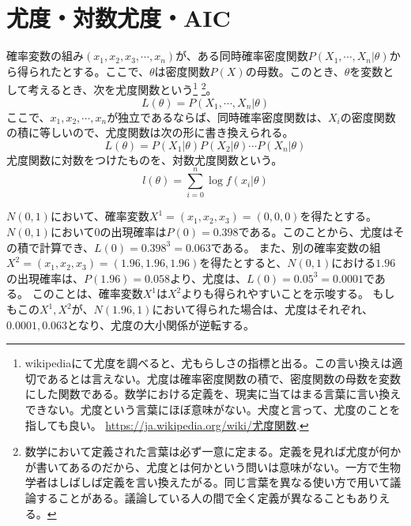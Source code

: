 \section{尤度・対数尤度・AIC}
\begin{defi}
    確率変数の組み$(x_1,x_2,x_3,\cdots,x_n)$が、ある同時確率密度関数$P(X_1,\cdots,X_n|\theta)$から得られたとする。ここで、$\theta$は密度関数$P(X)$の母数。このとき、$\theta$を変数として考えるとき、次を尤度関数という\footnote{wikipediaにて尤度を調べると、尤もらしさの指標と出る。この言い換えは適切であるとは言えない。尤度は確率密度関数の積で、密度関数の母数を変数にした関数である。数学における定義を、現実に当てはまる言葉に言い換えできない。尤度という言葉にほぼ意味がない。犬度と言って、尤度のことを指しても良い。
    \url{https://ja.wikipedia.org/wiki/尤度関数}.}
    \footnote{数学において定義された言葉は必ず一意に定まる。定義を見れば尤度が何かが書いてあるのだから、尤度とは何かという問いは意味がない。一方で生物学者はしばしば定義を言い換えたがる。同じ言葉を異なる使い方で用いて議論することがある。議論している人の間で全く定義が異なることもありえる。}。
    \begin{equation*}
        L(\theta) = P(X_1,\cdots,X_n|\theta)
    \end{equation*}
    ここで、$x_1,x_2,\cdots,x_n$が独立であるならば、同時確率密度関数は、$X_i$の密度関数の積に等しいので、尤度関数は次の形に書き換えられる。
    \begin{equation*}
        L(\theta ) = P(X_1|\theta)P(X_2|\theta)\cdots P(X_n|\theta)
    \end{equation*}
    尤度関数に対数をつけたものを、対数尤度関数という。
    \begin{equation*}
        l(\theta) = \sum_{i=0}^n \log f(x_i|\theta)
    \end{equation*}
\end{defi}

$N(0,1)$において、確率変数$X^1=(x_1,x_2,x_3)=(0,0,0)$を得たとする。$N(0,1)$において$0$の出現確率は$P(0)=0.398$である。このことから、尤度はその積で計算でき、$L(0)=0.398^3=0.063$である。
また、別の確率変数の組$X^2=(x_1,x_2,x_3)=(1.96,1.96,1.96)$を得たとすると、$N(0,1)$における$1.96$の出現確率は、$P(1.96)=0.058$より、尤度は、$L(0)=0.05^3=0.0001$である。
このことは、確率変数$X^1$は$X^2$よりも得られやすいことを示唆する。
もしもこの$X^1,X^2$が、$N(1.96,1)$において得られた場合は、尤度はそれぞれ、$0.0001,0.063$となり、尤度の大小関係が逆転する。


